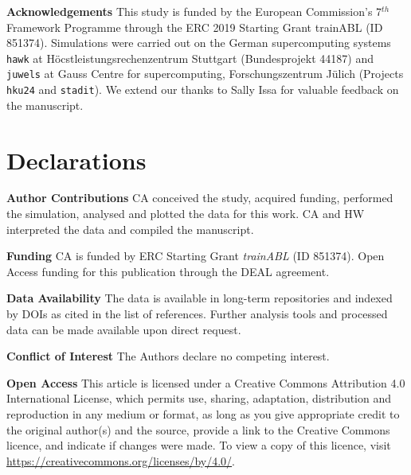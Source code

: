 \documentclass[smallcondensed,final]{svjour3}
\begin{document}
\vspace{1em}
\noindent\textbf{Acknowledgements} This study is funded by the European Commission's 7$^{th}$ Framework Programme through 
the ERC 2019 Starting Grant trainABL (ID 851374). Simulations were carried out on the German supercomputing systems 
\texttt{hawk} at H\"ocstleistungsrechenzentrum Stuttgart (Bundesprojekt 44187) and \texttt{juwels} at Gauss Centre for supercomputing, 
For\-schungs\-zen\-trum J\"ulich (Projects \texttt{hku24} and \texttt{stadit}). 
We extend our thanks to Sally Issa for valuable feedback on the manuscript. 



\section*{Declarations} 

\noindent\textbf{Author Contributions} CA conceived the study, acquired funding, performed the simulation, analysed and plotted the data for this work. CA and HW interpreted the data and compiled the manuscript. 
\vspace{1em} 

\noindent\textbf{Funding} CA is funded by ERC Starting Grant \emph{trainABL} (ID 851374). Open Access funding for this publication through the DEAL agreement. 
\vspace{1em}

\noindent\textbf{Data Availability} The data is available in long-term repositories and indexed by DOIs as cited in the list of references. Further analysis tools and processed data can be made available upon direct request. \vspace{1em}

\noindent\textbf{Conflict of Interest} The Authors declare no competing interest.
\vspace{1em}

\noindent\textbf{Open Access} This article is licensed under a Creative Commons Attribution 4.0 International License, which permits use, sharing, adaptation, distribution and reproduction in any medium or format, as long as you give appropriate credit to the original author(s) and the source, provide a link to the Creative Commons licence, and indicate if changes were made.  To view a copy of this licence, visit \href{http://creativecommons.org/licenses/by/4.0/}{https://creativecommons.org/licenses/by/4.0/}.


  

\end{document}
